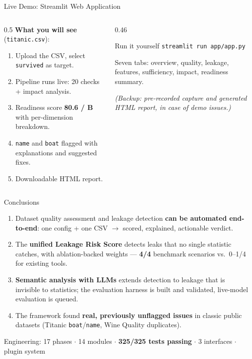 \documentclass[11pt,aspectratio=169]{beamer}
\begin{document}
\begin{frame}{Live Demo: Streamlit Web Application}
  \begin{columns}[T]
    \begin{column}{0.5\textwidth}
      \textbf{What you will see} (\texttt{titanic.csv}):
      \begin{enumerate}\setlength\itemsep{0.5em}
        \item Upload the CSV, select \texttt{survived} as target.
        \item Pipeline runs live: 20 checks + impact analysis.
        \item Readiness score \textbf{80.6 / B} with per-dimension breakdown.
        \item \texttt{name} and \texttt{boat} flagged with explanations and suggested fixes.
        \item Downloadable HTML report.
      \end{enumerate}
    \end{column}
    \begin{column}{0.46\textwidth}
      \begin{block}{Run it yourself}
        \texttt{streamlit run app/app.py}
      \end{block}
      \vspace{0.6em}
      \footnotesize Seven tabs: overview, quality, leakage, features, sufficiency, impact, readiness summary.
      \vspace{0.8em}

      \footnotesize\textit{(Backup: pre-recorded capture and generated HTML report, in case of demo issues.)}
    \end{column}
  \end{columns}
\end{frame}

\begin{frame}{Conclusions}
  \begin{enumerate}\setlength\itemsep{0.7em}
    \item Dataset quality assessment and leakage detection \textbf{can be automated end-to-end}: one config + one CSV $\rightarrow$ scored, explained, actionable verdict.
    \item The \textbf{unified Leakage Risk Score} detects leaks that no single statistic catches, with ablation-backed weights --- \textbf{4/4} benchmark scenarios vs.\ 0--1/4 for existing tools.
    \item \textbf{Semantic analysis with LLMs} extends detection to leakage that is invisible to statistics; the evaluation harness is built and validated, live-model evaluation is queued.
    \item The framework found \textbf{real, previously unflagged issues} in classic public datasets (Titanic \texttt{boat}/\texttt{name}, Wine Quality duplicates).
  \end{enumerate}
  \vspace{0.4em}
  \centering\footnotesize
  Engineering: 17 phases $\cdot$ 14 modules $\cdot$ \textbf{325/325 tests passing} $\cdot$ 3 interfaces $\cdot$ plugin system
\end{frame}
\end{document}
